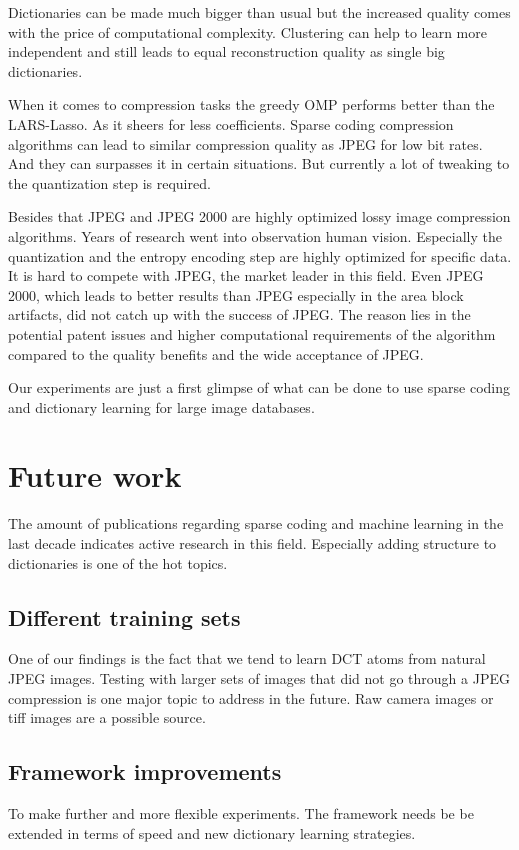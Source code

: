 Dictionaries can be made much bigger than usual but the increased quality
comes with the price of computational complexity. Clustering can help to learn
more independent and still leads to equal reconstruction quality as single big
dictionaries.

When it comes to compression tasks the greedy OMP performs better
than the LARS-Lasso. As it sheers for less coefficients. Sparse coding 
compression algorithms can lead to similar compression quality as JPEG 
for low bit rates. And they can surpasses it in certain situations. But
currently a lot of tweaking to the quantization step is required. 

Besides that JPEG and JPEG 2000 are highly optimized lossy image compression
algorithms. Years of research went into observation human vision. Especially the
quantization and the entropy encoding step are highly optimized for specific
data. It is hard to compete with JPEG, the market leader in this field.  Even
JPEG 2000, which leads to better results than JPEG especially in the area block
artifacts, did not catch up with the success of JPEG. The reason lies in the
potential patent issues and higher computational requirements of the algorithm
compared to the quality benefits and the wide acceptance of JPEG.

Our experiments are just a first glimpse of what can be done to use sparse
coding and dictionary learning for large image databases.

\section{Future work}
The amount of publications regarding sparse coding and machine learning in the
last decade indicates active research in this field. Especially
adding structure to dictionaries is one of the hot topics. 

\subsection{Different training sets}
One of our findings is the fact that we tend to learn DCT atoms from natural
JPEG images. Testing with larger sets of images that did not go through a JPEG
compression is one major topic to address in the future. Raw camera images or
tiff images are a possible source. 

\subsection{Framework improvements}
To make further and more flexible experiments. The framework needs be be
extended in terms of speed and new dictionary learning strategies.

